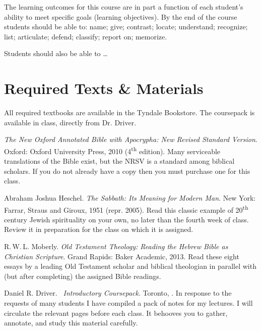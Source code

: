 \documentclass[titlepage]{article}
\begin{document}
The learning outcomes for this course are in part a function of each
student's ability to meet specific goals (learning objectives). By the
end of the course students should be able to:
	name;
	give;
	contrast;
	locate;
	understand;
	recognize;
	list;
	articulate;
	defend;
	classify;
	report on;
	memorize.

Students should also be able to \ldots

\section{Required Texts \& Materials}
\label{texts}

All required textbooks are available in the Tyndale Bookstore. The
coursepack is available in class, directly from Dr. Driver.

\begingroup
\renewcommand{\section}[2]{}%
\begin{thebibliography}{Heschel}%

	 \emph{The New Oxford Annotated Bible with
	Apocrypha: New Revised Standard Version}. Oxford: Oxford University
	Press, 2010 (4\textsuperscript{th} edition). Many serviceable
	translations of the Bible exist, but the NRSV is a standard among
	biblical scholars. If you do not already have a copy then you must
	purchase one for this class.

	 Abraham Joshua Heschel. \emph{The
	Sabbath: Its Meaning for Modern Man}. New York: Farrar, Straus and
	Giroux, 1951 (repr. 2005). Read this classic example of
	20\textsuperscript{th} century Jewish spirituality on your own, no
	later than the fourth week of class. Review it in preparation for
	the class on which it is assigned.

	 R.\,W.\,L. Moberly. \emph{Old Testament
	Theology: Reading the Hebrew Bible as Christian Scripture}. Grand
	Rapids: Baker Academic, 2013. Read these eight essays by a leading
	Old Testament scholar and biblical theologian in parallel with (but
	after completing) the assigned Bible readings.

	 Daniel R. Driver. \emph{\ctitle\ Introductory
	Coursepack}. Toronto, \csemester. In response to the requests of
	many students I have compiled a pack of notes for my lectures. I
	will circulate the relevant pages before each class. It behooves you
	to gather, annotate, and study this material carefully.

\end{thebibliography}
\endgroup
\end{document}
